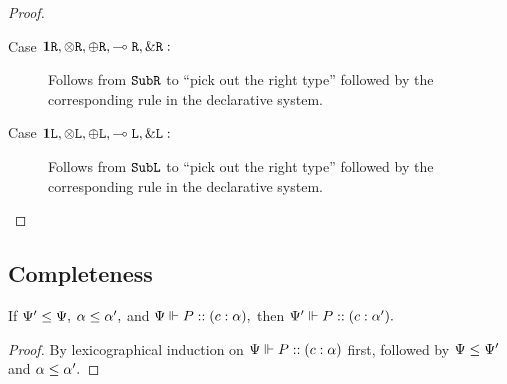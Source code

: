 \begin{proof}
\begin{description}
    \item[Case $\mathbf{1}\texttt{R}, \otimes\texttt{R}, \oplus\texttt{R}, \multimap\texttt{R}, \&\texttt{R} :$] Follows from $\texttt{Sub}\texttt{R}$ to ``pick out the right type'' followed by the corresponding rule in the declarative system.
    \item[Case $\mathbf{1}\texttt{L}, \otimes\texttt{L}, \oplus\texttt{L}, \multimap\texttt{L}, \&\texttt{L} :$] Follows from $\texttt{Sub}\texttt{L}$ to ``pick out the right type'' followed by the corresponding rule in the declarative system.
  \end{description}
\end{proof}


\subsection{Completeness}

\begin{lemma}
  \label{algorithmic:delegation-sub}
  If $\Psi' \le \Psi,$ $\alpha \le \alpha',$ and $\Psi \Vdash P :: (c : \alpha),$ then $\Psi' \Vdash P :: (c : \alpha').$
\end{lemma}
\begin{proof}
  By lexicographical induction on $\Psi \Vdash P :: (c : \alpha)$ first, followed by $\Psi \le \Psi'$ and $\alpha \le \alpha'.$
\end{proof}

